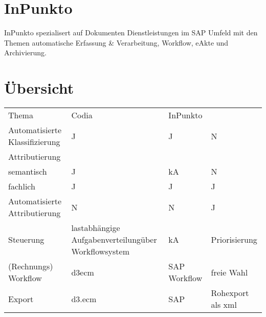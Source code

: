 \section{InPunkto}
InPunkto spezialisert auf Dokumenten Dienstleistungen im SAP Umfeld mit den Themen automatische Erfassung \& Verarbeitung, Workflow, 
eAkte und Archivierung.


\section{Übersicht}
%

\begin{center}
\begin{tabulary}{\textwidth}{LLLL}
Thema & Codia & InPunkto & \brand \\
Automatisierte Klassifizierung & J & J & N \\
Attributierung & & & \\
semantisch & J & kA & N\\
fachlich & J & J & J \\
Automatisierte Attributierung & N & N & J \\
Steuerung & lastabhängige Aufgabenverteilung\newline über Workflowsystem & kA & Priorisierung\\
(Rechnungs) Workflow & d3ecm & SAP Workflow & freie Wahl \\
Export & d3.ecm & SAP & Rohexport als xml\\
\end{tabulary}
\end{center}
